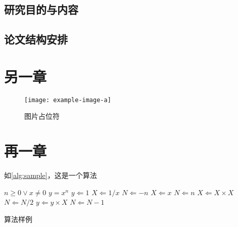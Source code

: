 \section{研究目的与内容}

\section{论文结构安排}

\chapter{另一章}


\begin{figure}[htbp]
    \centering
    \texttt{[image: example-image-a]}
    \caption{\label{fig:fig-placeholder}图片占位符}
\end{figure}

\chapter{再一章}

\par 如\autoref{alg:sample}，这是一个算法

\begin{algorithm}[H]
    \begin{algorithmic} %
        \REQUIRE $n \geq 0 \vee x \neq 0$
        \ENSURE $y = x^n$
        \STATE $y \Leftarrow 1$
            \STATE $X \Leftarrow 1 / x$
            \STATE $N \Leftarrow -n$
        \ELSE
            \STATE $X \Leftarrow x$
            \STATE $N \Leftarrow n$
        \ENDIF
                \STATE $X \Leftarrow X \times X$
                \STATE $N \Leftarrow N / 2$
            \ELSE[$N$ is odd]
                \STATE $y \Leftarrow y \times X$
                \STATE $N \Leftarrow N - 1$
            \ENDIF
        \ENDWHILE
    \end{algorithmic}
    \caption{\label{alg:sample}算法样例}
\end{algorithm}